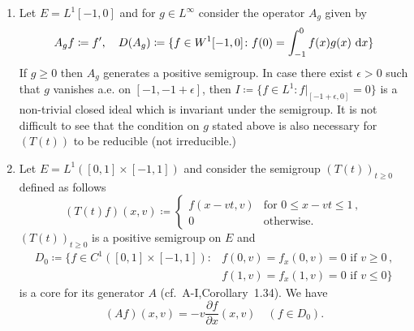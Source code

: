 \begin{examples}
\begin{enumerate}
	\item 
	Let $E = L^{1}[-1,0]$ and for $g \in L^{\infty}$ consider the operator $A_{g}$ given by
	\begin{equation}\label{eq:c3-3.2}
		A_{g}f \coloneqq f', \quad D(A_{g}) \coloneqq \{f \in W^{1}[-1,0] \colon f(0) = \int_{-1}^{0} f(x)g(x)\,\mathop{}\!\mathrm{d}{x}\}
	\end{equation}
	If $g \geq 0$ then $A_{g}$ generates a positive semigroup.
	In case there exist $\epsilon > 0$ such that $g$ vanishes a.e. on $[-1,-1+\epsilon]$, then $I \coloneqq \{f \in L^{1} \colon f|_{[-1+\epsilon,0]} = 0\}$ is a non-trivial closed ideal which is invariant under the semigroup.
	It is not difficult to see that the condition on $g$ stated above is also necessary for $(T(t))$ to be reducible (\ie  not irreducible.)
%
	\item 
	Let $E = L^{1}([0,1]\times[-1,1])$ and consider the semigroup $(T(t))_{t\geq 0}$ defined as follows
	\begin{equation}\label{eq:c3-3.3}
		(T(t)f)(x,v) \coloneqq \begin{cases}
			f(x-vt,v) & \text{for } 0 \leq x-vt \leq 1 \,,\\
			0 & \text{otherwise}.
		\end{cases}
	\end{equation}
		$(T(t))_{t\geq 0}$ is a positive semigroup on $E$ and
	\begin{align*}\label{eq:c3-D0}
		D_{0} \coloneqq \{f \in C^{1}([0,1]\times[-1,1]) \colon  
		& f(0,v) = f_{x}(0,v) = 0 \text{ if } v \geq 0\,,\\ 
		& f(1,v) = f_{x}(1,v) = 0 \text{ if } v \leq 0\}
	\end{align*}
	is a core for its generator $A$ (cf.\ A-I,Corollary~1.34).
	We have
	\begin{equation}\label{eq:c3-3.4}
		(Af)(x,v) = -v\frac{\partial f}{\partial x}(x,v) \quad (f \in D_{0}).
	\end{equation}
	

\end{enumerate}
\end{examples}
